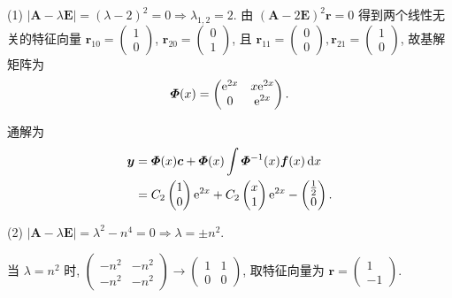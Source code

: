 \begin{solution}
  (1) $|\bm{A}-\lambda\bm{E}|=(\lambda-2)^2=0\Rightarrow\lambda_{1,2}=2$. 
  由 $(\bm{A}-2\bm{E})^2\bm{r}=0$ 得到两个线性无关的特征向量
  $\bm{r}_{10}=\begin{pmatrix}1\\0\end{pmatrix}$,
  $\bm{r}_{20}=\begin{pmatrix}0\\1\end{pmatrix}$, 
  且 $\bm{r}_{11}=\begin{pmatrix}0\\0\end{pmatrix},\bm{r}_{21}=\begin{pmatrix}1\\0\end{pmatrix}$,
  故基解矩阵为
  \[\bm{\varPhi}(x)=\begin{pmatrix}\mathrm{e}^{2x}&x\mathrm{e}^{2x}\\0&\mathrm{e}^{2x}\end{pmatrix}.\]

  通解为
  \begin{align*}
    \bm{y}
    & = \bm{\varPhi}(x)\bm{c}+\bm{\varPhi}(x)\int\bm{\varPhi}^{-1}(x)\bm{f}(x)\mathop{}\!\mathrm{d} x\\
    & = C_2\begin{pmatrix}1\\0\end{pmatrix}\mathrm{e}^{2x}
      + C_2\begin{pmatrix}x\\1\end{pmatrix}\mathrm{e}^{2x}-\begin{pmatrix}\frac{1}{2}\\0\end{pmatrix}.
  \end{align*}

  (2) $|\bm{A}-\lambda\bm{E}|=\lambda^2-n^4=0\Rightarrow\lambda=\pm n^2$.

  当 $\lambda=n^2$ 时, $\begin{pmatrix}-n^2&-n^2\\-n^2&-n^2\end{pmatrix}\to\begin{pmatrix}1&1\\0&0\end{pmatrix}$, 
  取特征向量为 $\bm{r}=\begin{pmatrix}1\\-1\end{pmatrix}$.


\end{solution}
